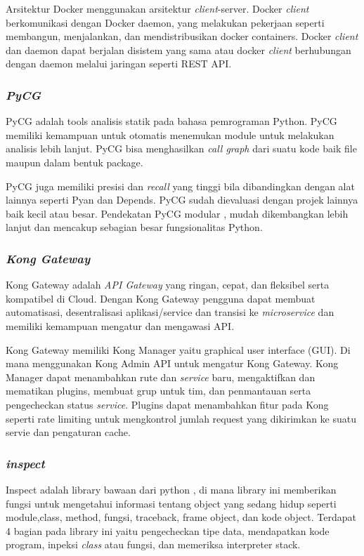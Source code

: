 Arsitektur Docker menggunakan arsitektur \textit{client}-server. Docker \textit{client} berkomunikasi dengan Docker daemon, yang melakukan pekerjaan seperti membangun, menjalankan, dan mendistribusikan docker containers. Docker \textit{client} dan daemon dapat berjalan disistem yang sama atau docker \textit{client} berhubungan dengan daemon melalui jaringan seperti REST API. 
\\
\subsubsection{\textit{PyCG} \cite{AD7}}
PyCG adalah tools analisis statik pada bahasa pemrograman Python. PyCG memiliki kemampuan untuk otomatis menemukan module untuk melakukan analisis lebih lanjut. PyCG bisa menghasilkan \textit{call graph} dari suatu kode baik file maupun dalam bentuk package.

PyCG juga memiliki presisi dan \textit{recall} yang tinggi bila dibandingkan dengan alat lainnya seperti Pyan dan Depends. PyCG sudah dievaluasi dengan projek lainnya baik kecil atau besar. Pendekatan PyCG modular , mudah dikembangkan lebih lanjut dan mencakup sebagian besar fungsionalitas Python.
\\
\subsubsection{\textit{Kong Gateway} \cite{kong}}
Kong Gateway adalah \textit{API Gateway} yang ringan, cepat, dan fleksibel serta kompatibel di Cloud. Dengan Kong Gateway pengguna dapat membuat automatisasi, desentralisasi aplikasi/service dan transisi ke \textit{microservice} dan memiliki kemampuan mengatur dan mengawasi API.

Kong Gateway memiliki Kong Manager yaitu graphical user interface (GUI). Di mana menggunakan Kong Admin API untuk mengatur Kong Gateway. Kong Manager dapat menambahkan rute dan \textit{service} baru, mengaktifkan dan mematikan plugins, membuat grup untuk tim, dan penmantauan serta pengecheckan status \textit{service}. Plugins dapat menambahkan fitur pada Kong seperti rate limiting untuk mengkontrol jumlah request yang dikirimkan ke suatu servie dan pengaturan cache.
\\
\subsubsection{\textit{inspect} \cite{inspect}}
Inspect adalah library bawaan dari python , di mana library ini memberikan fungsi untuk mengetahui informasi tentang object yang sedang hidup seperti module,class, method, fungsi, traceback, frame object, dan kode object. Terdapat 4 bagian pada library ini yaitu pengecheckan tipe data, mendapatkan kode program, inpeksi \textit{class} atau fungsi, dan memeriksa interpreter stack.

